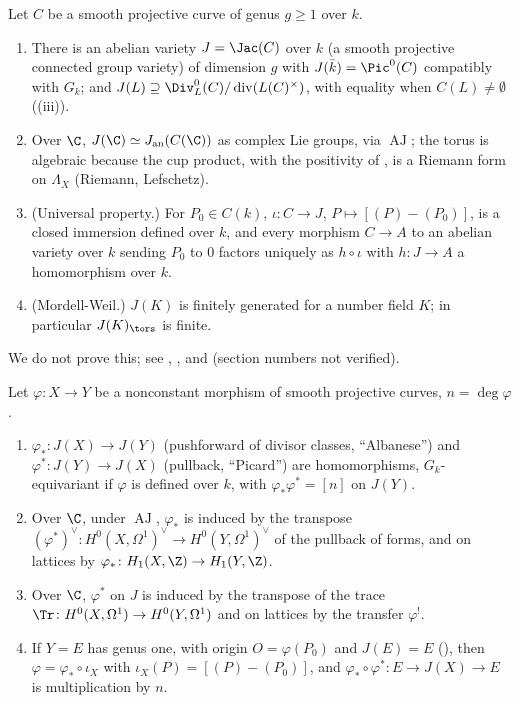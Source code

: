 \begin{theorem}\label{thm:curves:jacobian-variety}
Let $C$ be a smooth projective curve of genus $g\ge1$ over $k$.
\begin{enumerate}[label=(\roman*)]
\item There is an abelian variety $J=\Jac(C)$ over $k$ (a smooth projective connected group variety) of dimension $g$ with $J(\bar k)=\Pic^0(C)$ compatibly with $G_k$; and
$J(L)\supseteq\Div^0_L(C)/\operatorname{div}(L(C)^\times)$, with equality when $C(L)\ne\emptyset$ ((iii)).
\item Over $\C$, $J(\C)\simeq J_{\mathrm{an}}(C(\C))$ as complex Lie groups, via $\operatorname{AJ}$; the torus is algebraic because the cup product, with the positivity of
, is a Riemann form on $\Lambda_X$ (Riemann, Lefschetz).
\item (Universal property.) For $P_0\in C(k)$, $\iota\colon C\to J$, $P\mapsto[(P)-(P_0)]$, is a closed immersion defined over $k$, and every morphism $C\to A$ to an abelian variety
over $k$ sending $P_0$ to $0$ factors uniquely as $h\circ\iota$ with $h\colon J\to A$ a homomorphism over $k$.
\item (Mordell-Weil.) $J(K)$ is finitely generated for a number field $K$; in particular $J(K)_{\tors}$ is finite.
\end{enumerate}
\end{theorem}

We do not prove this; see \cite[Sections 1 to 6]{MilneJacobian86}, \cite{MilneAbelian86}, \cite[Section 24]{Mumford70} and \cite[Chapter 9]{BLR} (section numbers not
verified).

\begin{proposition}\label{prop:curves:jacobian-functoriality}
Let $\varphi\colon X\to Y$ be a nonconstant morphism of smooth projective curves, $n=\deg\varphi$.
\begin{enumerate}[label=(\roman*)]
\item $\varphi_*\colon J(X)\to J(Y)$ (pushforward of divisor classes, ``Albanese'') and $\varphi^*\colon J(Y)\to J(X)$ (pullback, ``Picard'') are homomorphisms, $G_k$-equivariant if $\varphi$
is defined over $k$, with $\varphi_*\varphi^*=[n]$ on $J(Y)$.
\item Over $\C$, under $\operatorname{AJ}$, $\varphi_*$ is induced by the transpose $(\varphi^*)^\vee\colon H^0(X,\Omega^1)^\vee\to H^0(Y,\Omega^1)^\vee$ of the pullback of forms, and on lattices by
$\varphi_*\colon H_1(X,\Z)\to H_1(Y,\Z)$.
\item Over $\C$, $\varphi^*$ on $J$ is induced by the transpose of the trace $\Tr\colon H^0(X,\Omega^1)\to H^0(Y,\Omega^1)$ and on lattices by the transfer $\varphi^!$.
\item If $Y=E$ has genus one, with origin $O=\varphi(P_0)$ and $J(E)=E$ (), then $\varphi=\varphi_*\circ\iota_X$ with $\iota_X(P)=[(P)-(P_0)]$, and
$\varphi_*\circ\varphi^*\colon E\to J(X)\to E$ is multiplication by $n$.
\end{enumerate}
\end{proposition}

